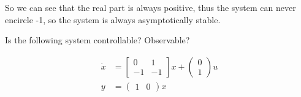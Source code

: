 \documentclass[11pt]{article}
\begin{document}
So we can see that the real part is always positive, thus the system can never encircle -1,
so the system is always asymptotically stable.

Is the following system controllable? Observable?

\begin{align*}
    \dot{x} &= \begin{bmatrix}
        0 & 1 \\ -1 & -1
    \end{bmatrix} x + \begin{pmatrix}
        0 \\ 1
    \end{pmatrix} u \\
    y &= \begin{pmatrix}
        1 & 0
    \end{pmatrix} x
\end{align*}

\soln
\end{document}
